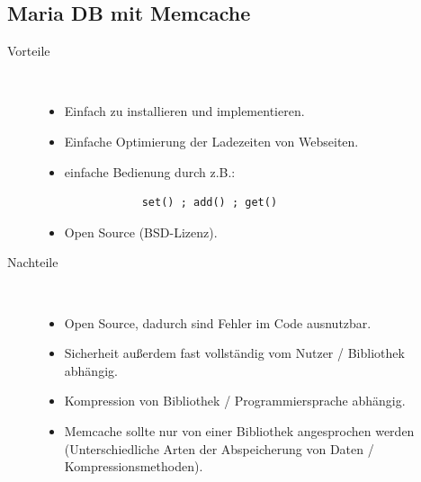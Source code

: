 \documentclass[a4paper, 12pt]{scrartcl}
\begin{document}
\subsection{Maria DB mit Memcache}

\begin{description}
	\item[Vorteile]~\par
	\begin{itemize}
		\item Einfach zu installieren und implementieren.
		\item Einfache Optimierung der Ladezeiten von Webseiten.
		\item einfache Bedienung durch z.B.: 
		\begin{verbatim}
			set() ; add() ; get()  
		\end{verbatim} 
		\item Open Source (BSD-Lizenz).


	\end{itemize}
\end{description}


\begin{description}
	\item[Nachteile]~\par
	\begin{itemize}
		\item Open Source, dadurch sind Fehler im Code ausnutzbar.
		\item Sicherheit außerdem fast vollständig vom Nutzer / Bibliothek abhängig. 
		\item Kompression von Bibliothek / Programmiersprache abhängig. 
		\item Memcache sollte nur von einer Bibliothek angesprochen werden (Unterschiedliche Arten der Abspeicherung von Daten / Kompressionsmethoden).

	\end{itemize}
\end{description}

\newpage
\end{document}
